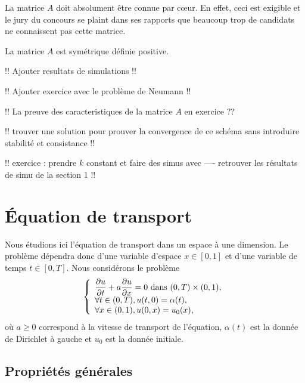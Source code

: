 \documentclass[12pt,a4paper,twoside]{article}
\begin{document}
\begin{remark}
  La matrice $A$ doit absolument \^etre connue par c\oe{}ur.
  En effet, ceci est exigible et le jury du concours se plaint dans ses rapports
  que beaucoup trop de candidats ne connaissent pas cette matrice.
\end{remark}

\begin{proposition}
  \label{prop:matSDP}
  La matrice $A$ est sym\'etrique d\'efinie positive.
\end{proposition}


!! Ajouter resultats de simulations !!

!! Ajouter exercice avec le probl\`eme de Neumann !!

!! La preuve des caracteristiques de la matrice $A$ en exercice ??

!! trouver une solution pour prouver la convergence de ce sch\'ema sans
introduire stabilit\'e et consistance !!


!! exercice : prendre $k$ constant et faire des simus avec ---- retrouver les 
r\'esultats de simu de la section 1 !!

\section{\'Equation de transport}

Nous \'etudions ici l'\'equation de transport dans un espace \`a une dimension.
Le probl\`eme d\'ependra donc d'une variable d'espace $x \in [0,1]$ et d'une variable de temps
$t \in [0,T]$.
Nous consid\'erons le probl\`eme
\begin{equation}
  \label{eq:transport}
  \left\{
    \begin{array}{l}
     \dfrac{\partial u}{\partial t} + a \dfrac{\partial u}{\partial x} = 0 
      \text{ dans } (0,T) \times (0,1),
      \\
      \forall t \in (0,T), u(t,0) = \alpha(t) ,
      \\
      \forall x \in (0,1), u(0,x) = u_0(x) ,
    \end{array}
  \right.
\end{equation}
o\`u $a \geq 0$ correspond \`a la vitesse de transport de l'\'equation,
$\alpha(t)$ est la donn\'ee de Dirichlet \`a gauche
et $u_0$ est la donn\'ee initiale.
\subsection{Propri\'et\'es g\'en\'erales}
\end{document}
